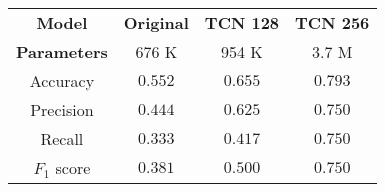 \begin{tabular}{c|ccc}
    \textbf{Model}      & \textbf{Original} & \textbf{TCN 128} & \textbf{TCN 256} \\
    \textbf{Parameters} & 676 K            & 954 K            & 3.7 M            \\\hline
    Accuracy            & $0.552$          & $0.655$          & $\mathbf{0.793}$ \\
    Precision           & $0.444$          & $0.625$          & $\mathbf{0.750}$ \\
    Recall              & $0.333$          & $0.417$          & $\mathbf{0.750}$ \\
    $F_1$ score         & $0.381$          & $0.500$          & $\mathbf{0.750}$ \\
\end{tabular}